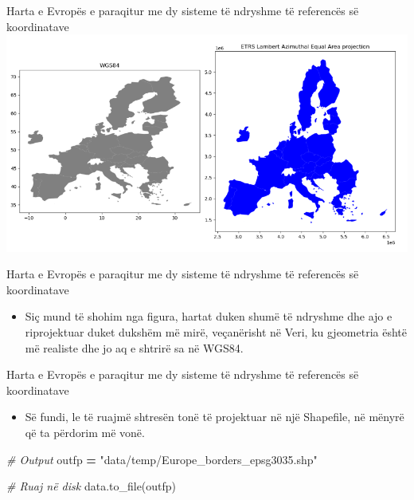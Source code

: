 \documentclass[
  ignorenonframetext,
]{beamer}
\newenvironment{Shaded}{\begin{snugshade}}{\end{snugshade}}
\newcommand{\CommentTok}[1]{\textcolor[rgb]{0.56,0.35,0.01}{\textit{#1}}}
\newcommand{\NormalTok}[1]{#1}
\newcommand{\OperatorTok}[1]{\textcolor[rgb]{0.81,0.36,0.00}{\textbf{#1}}}
\newcommand{\StringTok}[1]{\textcolor[rgb]{0.31,0.60,0.02}{#1}}
\providecommand{\tightlist}{%
  \setlength{\itemsep}{0pt}\setlength{\parskip}{0pt}}
\begin{document}
\begin{frame}{Harta e Evropës e paraqitur me dy sisteme të ndryshme të
referencës së koordinatave}
\protect\hypertarget{harta-e-evropuxebs-e-paraqitur-me-dy-sisteme-tuxeb-ndryshme-tuxeb-referencuxebs-suxeb-koordinatave}{}
\includegraphics{./Figs/lambert.png}
\end{frame}

\begin{frame}{Harta e Evropës e paraqitur me dy sisteme të ndryshme të
referencës së koordinatave}
\protect\hypertarget{harta-e-evropuxebs-e-paraqitur-me-dy-sisteme-tuxeb-ndryshme-tuxeb-referencuxebs-suxeb-koordinatave-1}{}
\begin{itemize}
\tightlist
\item
  Siç mund të shohim nga figura, hartat duken shumë të ndryshme dhe ajo
  e riprojektuar duket dukshëm më mirë, veçanërisht në Veri, ku
  gjeometria është më realiste dhe jo aq e shtrirë sa në WGS84.
\end{itemize}
\end{frame}

\begin{frame}[fragile]{Harta e Evropës e paraqitur me dy sisteme të
ndryshme të referencës së koordinatave}
\protect\hypertarget{harta-e-evropuxebs-e-paraqitur-me-dy-sisteme-tuxeb-ndryshme-tuxeb-referencuxebs-suxeb-koordinatave-2}{}
\begin{itemize}
\tightlist
\item
  Së fundi, le të ruajmë shtresën tonë të projektuar në një Shapefile,
  në mënyrë që ta përdorim më vonë.
\end{itemize}


\begin{Shaded}
\begin{Highlighting}[]
\CommentTok{\# Output}
\NormalTok{outfp }\OperatorTok{=} \StringTok{"data/temp/Europe\_borders\_epsg3035.shp"}

\CommentTok{\# Ruaj në disk}
\NormalTok{data.to\_file(outfp)  }
\end{Highlighting}
\end{Shaded}
\end{frame}
\end{document}
